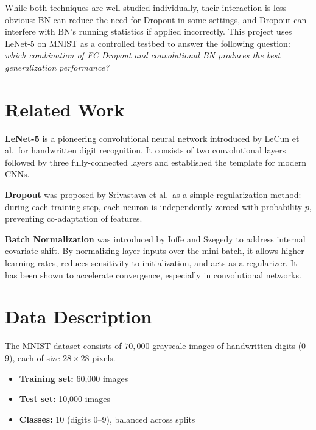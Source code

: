 \documentclass[11pt]{article}
\begin{document}
While both techniques are well-studied individually, their interaction is less obvious: BN
can reduce the need for Dropout in some settings, and Dropout can interfere with BN's
running statistics if applied incorrectly. This project uses LeNet-5 on MNIST as a
controlled testbed to answer the following question: \textit{which combination of FC Dropout
and convolutional BN produces the best generalization performance?}

\section{Related Work}
\textbf{LeNet-5} \cite{lecun1998gradient} is a pioneering convolutional neural network
introduced by LeCun et al.\ for handwritten digit recognition. It consists of two
convolutional layers followed by three fully-connected layers and established the template
for modern CNNs.

\textbf{Dropout} \cite{srivastava2014dropout} was proposed by Srivastava et al.\ as a
simple regularization method: during each training step, each neuron is independently
zeroed with probability $p$, preventing co-adaptation of features.

\textbf{Batch Normalization} \cite{ioffe2015batch} was introduced by Ioffe and Szegedy to
address internal covariate shift. By normalizing layer inputs over the mini-batch,
it allows higher learning rates, reduces sensitivity to initialization, and acts as
a regularizer. It has been shown to accelerate convergence, especially in convolutional
networks.

\section{Data Description}
The MNIST dataset \cite{lecun1998gradient} consists of $70{,}000$ grayscale images of
handwritten digits (0--9), each of size $28\times28$ pixels.

\begin{itemize}
  \item \textbf{Training set:} 60,000 images
  \item \textbf{Test set:} 10,000 images
  \item \textbf{Classes:} 10 (digits 0--9), balanced across splits
\end{itemize}
\end{document}
